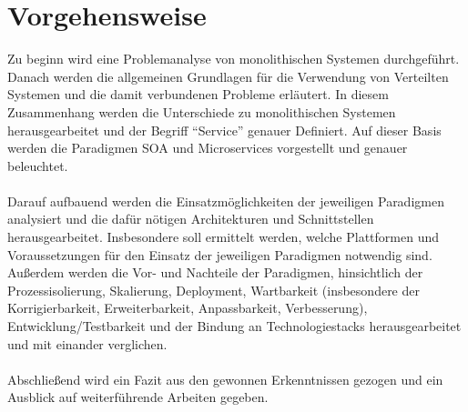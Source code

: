\section{Vorgehensweise}
\label{sec:Vorgehensweise}
Zu beginn wird eine Problemanalyse von monolithischen Systemen durchgeführt. Danach werden die allgemeinen Grundlagen für die Verwendung von Verteilten Systemen und die damit verbundenen Probleme erläutert. In diesem Zusammenhang werden die Unterschiede zu monolithischen Systemen herausgearbeitet und der Begriff "`Service"' genauer Definiert. Auf dieser Basis werden die Paradigmen SOA und Microservices vorgestellt und genauer beleuchtet.
\\\\
Darauf aufbauend werden die Einsatzmöglichkeiten der jeweiligen Paradigmen analysiert und die dafür nötigen Architekturen und Schnittstellen herausgearbeitet. Insbesondere soll ermittelt werden, welche Plattformen und Voraussetzungen für den Einsatz der jeweiligen Paradigmen notwendig sind. Außerdem werden die Vor- und Nachteile der Paradigmen, hinsichtlich der Prozessisolierung, Skalierung, Deployment, Wartbarkeit (insbesondere der Korrigierbarkeit, Erweiterbarkeit, Anpassbarkeit, Verbesserung), Entwicklung/Testbarkeit und der Bindung an Technologiestacks herausgearbeitet und mit einander verglichen.
\\\\
Abschließend wird ein Fazit aus den gewonnen Erkenntnissen gezogen und ein Ausblick auf weiterführende Arbeiten gegeben.